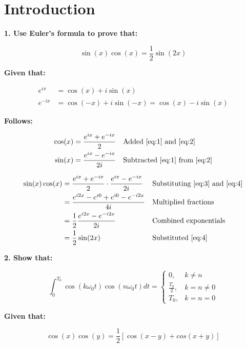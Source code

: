 \section*{Introduction}
\textbf{\large 1. Use Euler's formula to prove that:}

\begin{equation*}
	\sin(x) \cos(x) = \frac{1}{2} \sin(2x)
\end{equation*}

\textbf{Given that:}

\begin{align}
	e^{ix} &= \cos(x) + i \sin(x) \label{eq:1}\\
	e^{-ix} &= \cos(-x) + i \sin(-x) = \cos(x) - i \sin(x) \label{eq:2}
\end{align}

\textbf{Follows:}

\begin{align}
	\cos(x) &= \frac{e^{ix} + e^{-ix}}{2} & & \text{Added \eqref{eq:1} and \eqref{eq:2}} \label{eq:3}\\
	\sin(x) &= \frac{e^{ix} - e^{-ix}}{2i} & & \text{Subtracted \eqref{eq:1} from \eqref{eq:2}} \label{eq:4}
\end{align}

\begin{align*}
	\sin(x) \cos(x) &= \frac{e^{ix} + e^{-ix}}{2} \cdot \frac{e^{ix} - e^{-ix}}{2i} & & \text{Substituting \eqref{eq:3} and \eqref{eq:4}}\\
	&= \frac{e^{i2x} - e^{i0} + e^{i0} - e^{-i2x}}{4i} & & \text{Multiplied fractions}\\
	&= \frac{1}{2} \frac{e^{i2x} - e^{-i2x}}{2i} & & \text{Combined exponentials}\\
	&= \frac{1}{2} \sin(2x) & & \text{Substituted \eqref{eq:4}}
\end{align*}

\textbf{\large 2. Show that:}

\begin{equation*}
	\int_0^{T_0} \cos(k \omega_0 t) \cos(n \omega_0 t) dt =
	\begin{cases}
		0,& k \neq n\\
		\frac{T_0}{2},& k = n \neq 0\\
		T_0,& k = n = 0
	\end{cases}
\end{equation*}

\textbf{Given that:}

\begin{equation}
	\cos(x) \cos(y) = \frac{1}{2} \left[ \cos(x-y) + cos(x+y) \right]
\end{equation}

